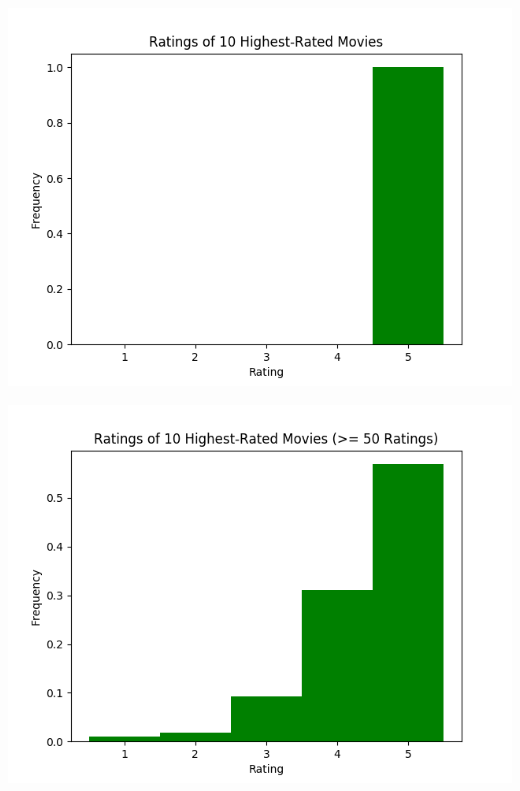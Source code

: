 \begin{appendices}
\begin{center}
\begin{minipage}{0.49\linewidth}
    \includegraphics[scale=0.5]{"Ratings of 10 Highest-Rated Movies"}
    \captionsetup{width=.75\linewidth}
  \end{minipage}
  \begin{minipage}{0.49\linewidth}
    \includegraphics[scale=0.5]{"Ratings of 10 Highest-Rated Movies (>= 50 Ratings)"}
    \captionsetup{width=.75\linewidth}
  \end{minipage}
  \begin{minipage}{0.49\linewidth}

\end{minipage}
\end{center}
\end{appendices}
